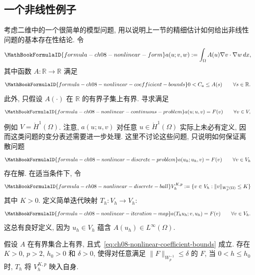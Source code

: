 \subsection{一个非线性例子}
\label{sec:ch08-nonlinear-example}
\setcounter{thmcount}{0}
\setcounter{equation}{0}

考虑二维中的一个很简单的模型问题, 用以说明上一节的精细估计如何给出非线性问题的基本存在性结论. 令
\begin{equation}
\MathBookFormulaID{formula-ch08-nonlinear-form}
\label{eq:ch08-nonlinear-form}
a(u;v,w):=\int_\Omega A(u)\nabla v\cdot\nabla w\,dx,
\end{equation}
其中函数 $A:\mathbb R\to\mathbb R$ 满足
\begin{equation}
\MathBookFormulaID{formula-ch08-nonlinear-coefficient-bounds}
\label{eq:ch08-nonlinear-coefficient-bounds}
0<C_a\leq A(s)
\qquad\forall s\in\mathbb R.
\end{equation}
此外, 只假设 $A(\cdot)$ 在 $\mathbb R$ 的有界子集上有界. 寻求满足
\begin{equation}
\MathBookFormulaID{formula-ch08-nonlinear-continuous-problem}
\label{eq:ch08-nonlinear-continuous-problem}
a(u;u,v)=F(v)
\qquad\forall v\in V,
\end{equation}
例如 $V=\mathring H^1(\Omega)$. 注意, $a(u;u,v)$ 对任意 $u\in\mathring H^1(\Omega)$ 实际上未必有定义, 因而这类问题的变分表述需要进一步处理. 这里不讨论这些问题, 只说明如何保证离散问题
\begin{equation}
\MathBookFormulaID{formula-ch08-nonlinear-discrete-problem}
\label{eq:ch08-nonlinear-discrete-problem}
a(u_h;u_h,v)=F(v)
\qquad\forall v\in V_h
\end{equation}
存在解. 在适当条件下, 令
\begin{equation}
\MathBookFormulaID{formula-ch08-nonlinear-discrete-ball}
\label{eq:ch08-nonlinear-discrete-ball}
V_h^{K,p}:=\{v\in V_h:\|v\|_{W_p^1(\Omega)}\leq K\}
\end{equation}
其中 $K>0$. 定义简单迭代映射 $T_h:V_h\to V_h$:
\begin{equation}
\MathBookFormulaID{formula-ch08-nonlinear-iteration-map}
\label{eq:ch08-nonlinear-iteration-map}
a(T_hu_h;v,u_h)=F(v)
\qquad\forall v\in V_h.
\end{equation}
这总有良好定义, 因为 $u_h\in V_h$ 蕴含 $A(u_h)\in L^\infty(\Omega)$.

\begin{Theorem}
\label{thm:ch08-nonlinear-invariant-ball}
假设 $A$ 在有界集合上有界, 且式~\eqref{eq:ch08-nonlinear-coefficient-bounds} 成立. 存在 $K>0$, $p>2$, $h_0>0$ 和 $\delta>0$, 使得对任意满足 $\|F\|_{W_p^{-1}}\leq\delta$ 的 $F$, 当 $0<h\leq h_0$ 时, $T_h$ 将 $V_h^{K,p}$ 映入自身.
\end{Theorem}

